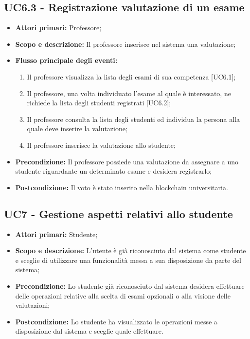 \documentclass[AnalisiDeiRequisiti.tex]{subfiles}
\begin{document}
\subsection{UC6.3 - Registrazione valutazione di un esame}
\begin{itemize}
	\item \textbf{Attori primari:} Professore;\\
	\item \textbf{Scopo e descrizione:} Il professore inserisce nel sistema una valutazione;\\
	\item \textbf{Flusso principale degli eventi:}\\
	\begin{enumerate}
		\item Il professore visualizza la lista degli esami di sua competenza [UC6.1];
		\item Il professore, una volta individuato l'esame al quale è interessato, ne richiede la lista degli studenti registrati [UC6.2];
		\item Il professore consulta la lista degli studenti ed individua la persona alla quale deve inserire la valutazione;
		\item Il professore inserisce la valutazione allo studente;
	\end{enumerate}
	\item \textbf{Precondizione:} Il professore possiede una valutazione da assegnare a uno studente riguardante un determinato esame e desidera registrarlo;\\
	\item \textbf{Postcondizione:} Il voto è stato inserito nella blockchain universitaria.\\
\end{itemize}


\subsection{UC7 - Gestione aspetti relativi allo studente}
\begin{itemize}
	\item \textbf{Attori primari:} Studente;\\
	\item \textbf{Scopo e descrizione:} L'utente è già riconosciuto dal sistema come studente e sceglie di utilizzare una funzionalità messa a sua disposizione da parte del sistema;\\
	\item \textbf{Precondizione:} Lo studente già riconosciuto dal sistema desidera effettuare delle operazioni relative alla scelta di esami opzionali o alla visione delle valutazioni;\\
	\item \textbf{Postcondizione:} Lo studente ha visualizzato le operazioni messe a disposizione dal sistema e sceglie quale effettuare.\\
\end{itemize}
\end{document}

